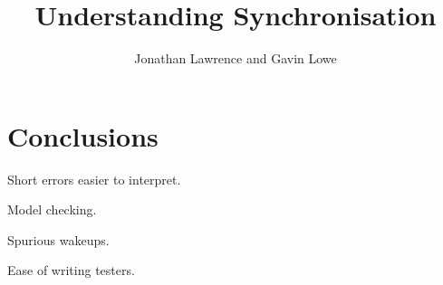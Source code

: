 \documentclass[12pt,a4paper]{article}
\title{Understanding Synchronisation}
\author{Jonathan Lawrence and Gavin Lowe}
\begin{document}
\maketitle







\section{Conclusions}
\label{sec:conc}

Short errors easier to interpret.

Model checking. 

Spurious wakeups.

Ease of writing testers. 



\end{document}
